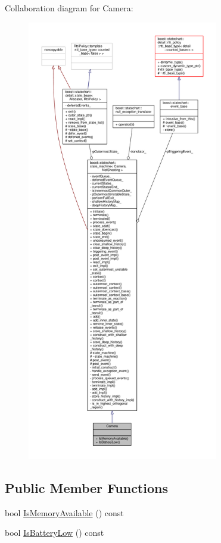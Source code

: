 Collaboration diagram for Camera\+:
\nopagebreak
\begin{figure}[H]
\begin{center}
\leavevmode
\includegraphics[height=550pt]{struct_camera__coll__graph}
\end{center}
\end{figure}
\subsection*{Public Member Functions}
\begin{DoxyCompactItemize}
\item 
bool \mbox{\hyperlink{struct_camera_ab1b02870623f49f0fe23dbcaad3b1996}{Is\+Memory\+Available}} () const
\item 
bool \mbox{\hyperlink{struct_camera_a1c08df3b24d4fddfb098f667b562388e}{Is\+Battery\+Low}} () const
\end{DoxyCompactItemize}
